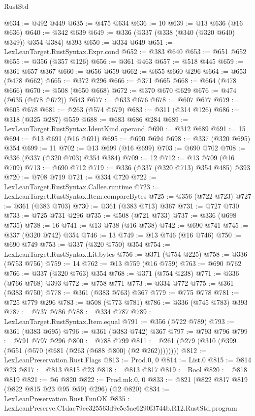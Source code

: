 \begin{lexlean}{RustStd}
\begin{coremodule}
@634 := @492 @449
@635 := @475 @634
@636 := 10
@639 := @13 @636 (@16 @636)
@640 := @342 @639
@649 := @336 (@337 (@338 (@340 (@320 @640) @349)) @354 @384) @393
@650 := @334 @649
@651 := LexLeanTarget.RustSyntax.Expr.cond
@652 := @383 @640
@653 := @651 @652
@655 := @356 (@357 @126)
@656 := @361 @463
@657 := @518 @445
@659 := @361 @657 @367
@660 := @656 @659
@662 := @655 @660 @296
@664 := @653 (@478 @662)
@665 := @372 @296
@666 := @371 @665
@668 := @664 (@478 @666)
@670 := @508 (@650 @668)
@672 := @370 @670 @629
@676 := @474 (@635 (@478 @672)) @543
@677 := @633 @676
@678 := @607 @677
@679 := @605 @678
@681 := @263 (@574 @679)
@683 := @311 (@314 @126)
@686 := @318 (@325 @287) @559
@688 := @683 @686 @284
@689 := LexLeanTarget.RustSyntax.IdentKind.operand
@690 := @312 @689
@691 := 15
@694 := @13 @691 (@16 @691)
@695 := @690 @694
@698 := @337 (@320 @695) @354
@699 := 11
@702 := @13 @699 (@16 @699)
@703 := @690 @702
@708 := @336 (@337 (@320 @703) @354 @384)
@709 := 12
@712 := @13 @709 (@16 @709)
@713 := @690 @712
@719 := @336 (@337 (@320 @713) @354 @485) @393
@720 := @708 @719
@721 := @334 @720
@722 := LexLeanTarget.RustSyntax.Callee.runtime
@723 := LexLeanTarget.RustSyntax.Item.compareBytes
@725 := @356 (@722 @723)
@727 := @361 (@383 @703)
@730 := @361 (@383 @713) @367
@731 := @727 @730
@733 := @725 @731 @296
@735 := @508 (@721 @733)
@737 := @336 (@698 @735)
@738 := 16
@741 := @13 @738 (@16 @738)
@742 := @690 @741
@745 := @337 (@320 @742) @354
@746 := 13
@749 := @13 @746 (@16 @746)
@750 := @690 @749
@753 := @337 (@320 @750) @354
@754 := LexLeanTarget.RustSyntax.Lit.bytes
@756 := @371 (@754 @225)
@758 := @336 (@753 @756)
@759 := 14
@762 := @13 @759 (@16 @759)
@763 := @690 @762
@766 := @337 (@320 @763) @354
@768 := @371 (@754 @238)
@771 := @336 (@766 @768) @393
@772 := @758 @771
@773 := @334 @772
@775 := @361 (@383 @750)
@778 := @361 (@383 @763) @367
@779 := @775 @778
@781 := @725 @779 @296
@783 := @508 (@773 @781)
@786 := @336 (@745 @783) @393
@787 := @737 @786
@788 := @334 @787
@789 := LexLeanTarget.RustSyntax.Item.equal
@791 := @356 (@722 @789)
@793 := @361 (@383 @695)
@796 := @361 (@383 @742) @367
@797 := @793 @796
@799 := @791 @797 @296
@800 := @788 @799
@811 := @261 (@279 (@310 (@399 (@551 (@570 (@681 (@263 (@688 @800) (@2 @262))))))))
@812 := LexLeanPreservation.Rust.Flags
@813 := Prod.{0, 0}
@814 := List.{0}
@815 := @814 @23
@817 := @813 @815 @23
@818 := @813 @817
@819 := Bool
@820 := @818 @819
@821 := @6 @820
@822 := Prod.mk.{0, 0}
@833 := @821 (@822 @817 @819 (@822 @815 @23 @95 @59) @296) (@2 @820)
@834 := LexLeanPreservation.Rust.FunOK
@835 := LexLeanPreserve.C1dac79ee325563d9c5e5ac6290f3744b.R12.RustStd.program

\end{coremodule}
\end{lexlean}
